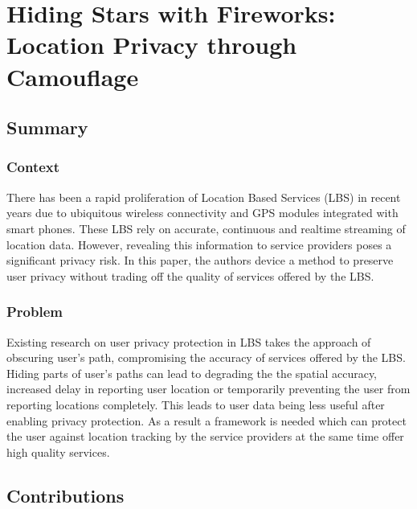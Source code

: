 \newpage
\section{Hiding Stars with Fireworks:
Location Privacy through Camouflage~\cite{conf/europar/PetzoldBTU06}}\label{lect4}

\subsection*{Summary}

\subsubsection*{Context}

There has been a rapid proliferation of Location Based Services (LBS) in recent
years due to ubiquitous wireless connectivity and GPS modules integrated with 
smart phones. These LBS rely on accurate, continuous and realtime streaming of 
location data. However, revealing this information to service providers poses a 
significant privacy risk. In this paper, the authors device a method to preserve
user privacy without trading off the quality of services offered by the LBS. 

\subsubsection*{Problem}

Existing research on user privacy protection in LBS takes the approach of 
obscuring user's path, compromising the accuracy of services offered by the 
LBS. Hiding parts of user's paths can lead to degrading the the spatial accuracy, 
increased delay in reporting user location or temporarily preventing the user from
reporting locations completely. This leads to user data being less useful after
enabling privacy protection. As a result a framework is needed which can protect
the user against location tracking by the service providers at the same time
offer high quality services. 
  
\subsection*{Contributions}


